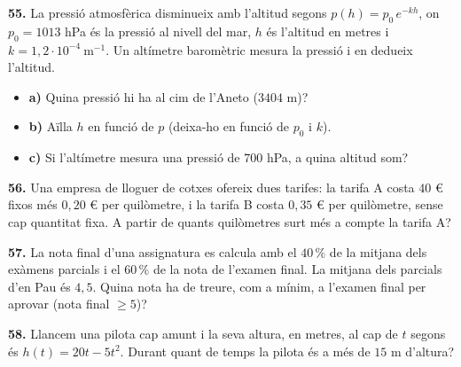 \documentclass[13pt,a4paper]{extarticle}
\begin{document}
\par\noindent\begin{minipage}{\linewidth}
\textbf{55.} La pressió atmosfèrica disminueix amb l'altitud segons $p(h)=p_0\,e^{-kh}$, on $p_0=1013$ hPa és la pressió al nivell del mar, $h$ és l'altitud en metres i $k=1{,}2\cdot 10^{-4}\ \text{m}^{-1}$. Un altímetre baromètric mesura la pressió i en dedueix l'altitud.\par

\begin{itemize}[leftmargin=0pt,itemsep=6pt,topsep=4pt,parsep=0pt,label={}]
\item \textbf{a)} Quina pressió hi ha al cim de l'Aneto ($3404$ m)?
\item \textbf{b)} Aïlla $h$ en funció de $p$ (deixa-ho en funció de $p_0$ i $k$).
\item \textbf{c)} Si l'altímetre mesura una pressió de $700$ hPa, a quina altitud som?
\end{itemize}
\end{minipage}\par\vspace{1.6mm}
\par\noindent\begin{minipage}{\linewidth}
\textbf{56.} Una empresa de lloguer de cotxes ofereix dues tarifes: la tarifa A costa $40$ € fixos més $0{,}20$ € per quilòmetre, i la tarifa B costa $0{,}35$ € per quilòmetre, sense cap quantitat fixa. A partir de quants quilòmetres surt més a compte la tarifa A?\par
\end{minipage}\par\vspace{1.6mm}
\par\noindent\begin{minipage}{\linewidth}
\textbf{57.} La nota final d'una assignatura es calcula amb el $40\,\%$ de la mitjana dels exàmens parcials i el $60\,\%$ de la nota de l'examen final. La mitjana dels parcials d'en Pau és $4{,}5$. Quina nota ha de treure, com a mínim, a l'examen final per aprovar (nota final $\geq 5$)?\par
\end{minipage}\par\vspace{1.6mm}
\par\noindent\begin{minipage}{\linewidth}
\textbf{58.} Llancem una pilota cap amunt i la seva altura, en metres, al cap de $t$ segons és $h(t)=20t-5t^2$. Durant quant de temps la pilota és a més de $15$ m d'altura?\par
\end{minipage}\par\vspace{1.6mm}
\end{document}
